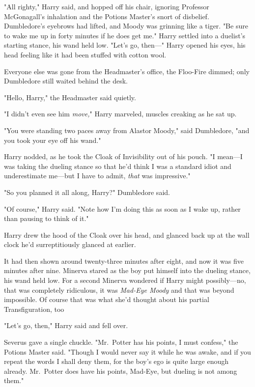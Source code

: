 "All righty," Harry said, and hopped off his chair, ignoring Professor
McGonagall's inhalation and the Potions Master's snort of disbelief.
Dumbledore's eyebrows had lifted, and Moody was grinning like a tiger. "Be sure
to wake me up in forty minutes if he does get me." Harry settled into a
duelist's starting stance, his wand held low. "Let's go, then---"
\sbreak
Harry opened his eyes, his head feeling like it had been stuffed with cotton
wool.

Everyone else was gone from the Headmaster's office, the Floo-Fire dimmed; only
Dumbledore still waited behind the desk.

"Hello, Harry," the Headmaster said quietly.

"I didn't even see him \emph{move,}" Harry marveled, muscles creaking as he
sat up.

"You were standing two paces away from Alastor Moody," said Dumbledore, "and
you took your eye off his wand."

Harry nodded, as he took the Cloak of Invisibility out of his pouch. "I
mean---I was taking the dueling stance so that he'd think I was a standard
idiot and underestimate me---but I have to admit, \emph{that} was impressive."

"So you planned it all along, Harry?" Dumbledore said.

"Of course," Harry said. "Note how I'm doing this as soon as I wake up, rather
than pausing to think of it."

Harry drew the hood of the Cloak over his head, and glanced back up at the wall
clock he'd surreptitiously glanced at earlier.

It had then shown around twenty-three minutes after eight, and now it was five
minutes after nine.
\sbreak
Minerva stared as the boy put himself into the dueling stance, his wand held
low. For a second Minerva wondered if Harry might possibly---no, that was
completely ridiculous, it was \emph{Mad-Eye Moody} and that was beyond
impossible. Of course that was what she'd thought about his partial
Transfiguration, too{\el}

"Let's go, then," Harry said and fell over.

Severus gave a single chuckle. "Mr.~Potter has his points, I must confess," the
Potions Master said. "Though I would never say it while he was awake, and if
you repeat the words I shall deny them, for the boy's ego is quite large enough
already. Mr.~Potter does have his points, Mad-Eye, but dueling is not among
them."

